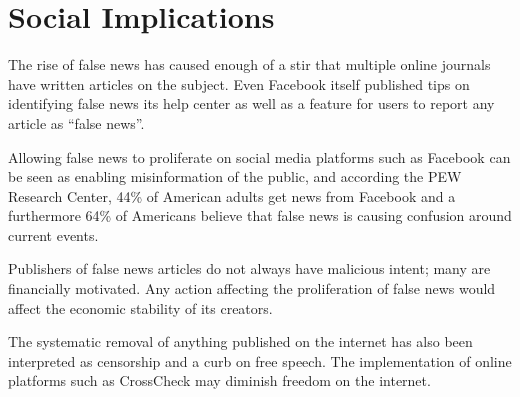
\section{Social Implications}


The rise of false news has caused enough of a stir that multiple online journals have written articles on the subject. \cite{tc_what_is_fake_news,telegraph_fake_news,npr_fake_news} Even Facebook itself published tips on identifying false news its help center \cite{fb_spot_fake_news} as well as a feature for users to report any article as ``false news''. \cite{tc_fb_down_ranks_fake_news}

Allowing false news to proliferate on social media platforms such as Facebook can be seen as enabling misinformation of the public, \cite{tc_facebook_responsibility} and according the PEW Research Center, 44\% of American adults get news from Facebook \cite{pew_social_media_news}  and a furthermore 64\% of Americans believe that false news is causing confusion around current events. \cite{pew_fn_confusion}

Publishers of false news articles do not always have malicious intent; \cite{cbs_fake_news} many are financially motivated. \cite{fb_addressing_hoaxes} Any action affecting the proliferation of false news would affect the economic stability of its creators.

%
%

The systematic removal of anything published on the internet has also been interpreted as censorship and a curb on free speech. \cite{eff_cali_bill_distrastrous} The implementation of online platforms such as CrossCheck may diminish freedom on the internet.
